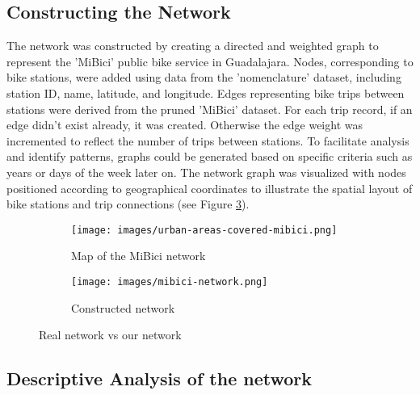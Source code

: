 \documentclass[conference]{IEEEtran}
\begin{document}
\subsection{Constructing the Network}
The network was constructed by creating a directed and weighted graph to represent the 'MiBici' public bike service in Guadalajara. Nodes, corresponding to bike stations, were added using data from the 'nomenclature' dataset, including station ID, name, latitude, and longitude. Edges representing bike trips between stations were derived from the pruned 'MiBici' dataset. For each trip record, if an edge didn't exist already, it was created. Otherwise the edge weight was incremented to reflect the number of trips between stations. To facilitate analysis and identify patterns, graphs could be generated based on specific criteria such as years or days of the week later on. The network graph was visualized with nodes positioned according to geographical coordinates to illustrate the spatial layout of bike stations and trip connections (see Figure \ref{fig:side_by_side}).

\begin{figure}[htbp]
    \centering
    \begin{subfigure}[b]{0.20\textwidth}
        \centering
        \texttt{[image: images/urban-areas-covered-mibici.png]}
        \caption{Map of the MiBici network}
        \label{fig:network}
    \end{subfigure}
    \hfill
    \begin{subfigure}[b]{0.20\textwidth}
        \centering
        \texttt{[image: images/mibici-network.png]}
        \caption{Constructed network}
        \label{fig:map}
    \end{subfigure}
    \caption{Real network vs our network}
    \label{fig:side_by_side}
\end{figure}

\subsection{Descriptive Analysis of the network}
\end{document}
